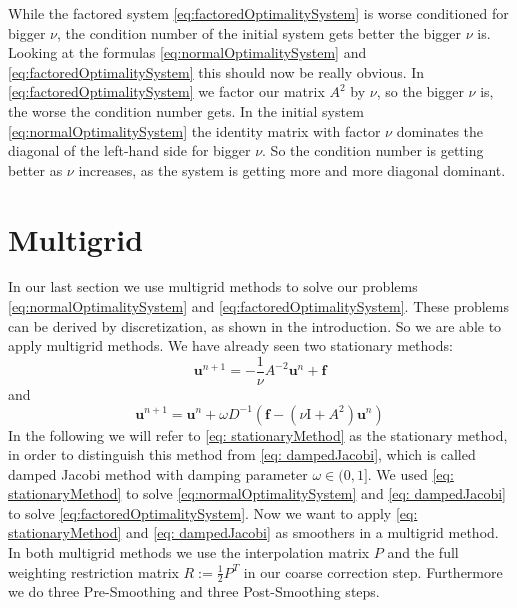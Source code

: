 \documentclass{amsart}
\theoremstyle{definition}
\theoremstyle{remark}
\numberwithin{equation}{section}
\newcommand{\Id}{\mathrm{I}}
\renewcommand{\vec}{\textbf}
\begin{document}
While the factored system \eqref{eq:factoredOptimalitySystem} is worse conditioned for bigger $\nu$, the condition number of the initial system 
gets better the bigger $\nu$ is. Looking at the formulas \eqref{eq:normalOptimalitySystem} and \eqref{eq:factoredOptimalitySystem} this should now be 
really obvious.
In \eqref{eq:factoredOptimalitySystem} we factor our matrix $A^2$ by $\nu$, so the bigger $\nu$ is, the worse the condition number gets. In the initial 
system \eqref{eq:normalOptimalitySystem} the identity matrix with factor $\nu$ dominates the diagonal of the left-hand side for bigger $\nu$. So the 
condition number is getting better as $\nu$ increases, as the system is getting more and more diagonal dominant.


\section{Multigrid}


In our last section we use multigrid methods to solve our problems \eqref{eq:normalOptimalitySystem} and \ref{eq:factoredOptimalitySystem}. These problems can be derived by discretization, as shown in the introduction. So we are able to apply multigrid methods. We have already seen two stationary methods:
\begin{equation}
\vec{u}^{n+1}    = - \frac{1}{\nu} A^{-2} \vec{u}^n+ \vec{f}
\label{eq: stationaryMethod}
\end{equation}
and 
\begin{equation}
\vec{u}^{n+1}    =  \vec{u}^n+ \omega D^{-1}  (\vec{f} - (\nu \Id + A^2) \vec{u}^n)
\label{eq: dampedJacobi}
\end{equation}
In the following we will refer to \eqref{eq: stationaryMethod} as the stationary method, in order to distinguish this method from \eqref{eq: 
dampedJacobi}, which is called damped Jacobi method with damping parameter $\omega \in (0,1] $. We used \eqref{eq: stationaryMethod} to solve  
\eqref{eq:normalOptimalitySystem} and \eqref{eq: dampedJacobi} to solve \eqref{eq:factoredOptimalitySystem}. Now we want to apply \eqref{eq: 
stationaryMethod} and \eqref{eq: dampedJacobi} as smoothers in a multigrid method. In both multigrid methods we use the interpolation matrix $P
$ and the full weighting restriction matrix $R:= \frac{1}{2} P^T$  in our coarse correction step. Furthermore we do three Pre-Smoothing and 
three Post-Smoothing steps. 
\end{document}
